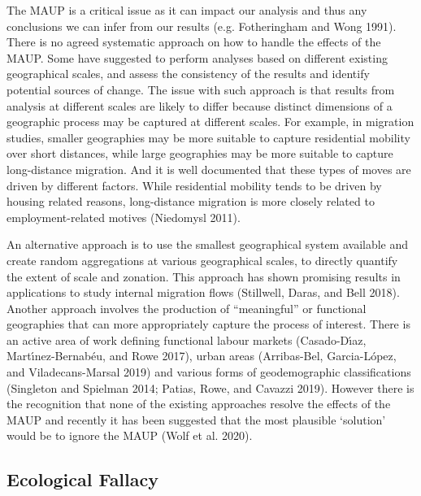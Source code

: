 \documentclass[
  letterpaper,
  krantz2]{style/krantz}
\begin{document}
The MAUP is a critical issue as it can impact our analysis and thus any
conclusions we can infer from our results (e.g. Fotheringham and Wong
1991). There is no agreed systematic approach on how to handle the
effects of the MAUP. Some have suggested to perform analyses based on
different existing geographical scales, and assess the consistency of
the results and identify potential sources of change. The issue with
such approach is that results from analysis at different scales are
likely to differ because distinct dimensions of a geographic process may
be captured at different scales. For example, in migration studies,
smaller geographies may be more suitable to capture residential mobility
over short distances, while large geographies may be more suitable to
capture long-distance migration. And it is well documented that these
types of moves are driven by different factors. While residential
mobility tends to be driven by housing related reasons, long-distance
migration is more closely related to employment-related motives
(Niedomysl 2011).

An alternative approach is to use the smallest geographical system
available and create random aggregations at various geographical scales,
to directly quantify the extent of scale and zonation. This approach has
shown promising results in applications to study internal migration
flows (Stillwell, Daras, and Bell 2018). Another approach involves the
production of ``meaningful'' or functional geographies that can more
appropriately capture the process of interest. There is an active area
of work defining functional labour markets (Casado-Dı́az,
Martı́nez-Bernabéu, and Rowe 2017), urban areas (Arribas-Bel,
Garcia-López, and Viladecans-Marsal 2019) and various forms of
geodemographic classifications (Singleton and Spielman 2014; Patias,
Rowe, and Cavazzi 2019). However there is the recognition that none of
the existing approaches resolve the effects of the MAUP and recently it
has been suggested that the most plausible `solution' would be to ignore
the MAUP (Wolf et al. 2020).

\hypertarget{ecological-fallacy}{%
\subsection{Ecological Fallacy}\label{ecological-fallacy}}
\end{document}
